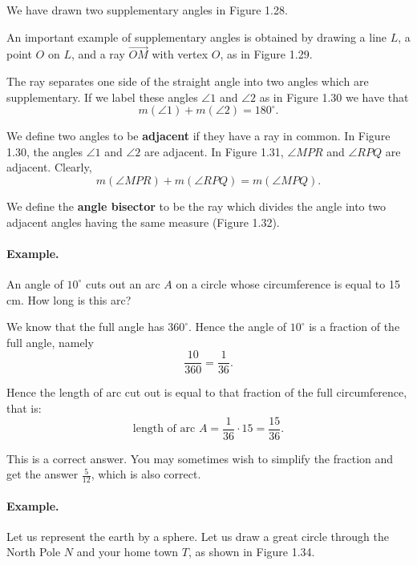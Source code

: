 \documentclass[12pt]{book} %
\begin{document}
We have drawn two supplementary angles in Figure 1.28.


An important example of supplementary angles is obtained by drawing a line $L$, a point $O$ on $L$, and a ray $\overrightarrow{OM}$ with vertex $O$, as in Figure 1.29.


The ray separates one side of the straight angle into two angles which are supplementary. If we label these angles $\angle 1$ and $\angle 2$ as in Figure 1.30 we have that
\[
m(\angle 1)+m(\angle 2)=180^\circ.
\]


We define two angles to be \textbf{adjacent} if they have a ray in common. In Figure 1.30, the angles $\angle 1$ and $\angle 2$ are adjacent. In Figure 1.31, $\angle MPR$ and $\angle RPQ$ are adjacent. Clearly,
\[
m(\angle MPR)+m(\angle RPQ)=m(\angle MPQ).
\]


We define the \textbf{angle bisector} to be the ray which divides the angle into two adjacent angles having the same measure (Figure 1.32).


\paragraph{Example.}
An angle of $10^\circ$ cuts out an arc $A$ on a circle whose circumference is equal to 15 cm. How long is this arc?


We know that the full angle has $360^\circ$. Hence the angle of $10^\circ$ is a fraction of the full angle, namely
\[
\frac{10}{360}=\frac{1}{36}.
\]

Hence the length of arc cut out is equal to that fraction of the full circumference, that is:
\[
\text{length of arc }A=\frac{1}{36}\cdot 15=\frac{15}{36}.
\]

This is a correct answer. You may sometimes wish to simplify the fraction and get the answer $\frac{5}{12}$, which is also correct.

\paragraph{Example.}
Let us represent the earth by a sphere. Let us draw a great circle through the North Pole $N$ and your home town $T$, as shown in Figure 1.34.
\end{document}
